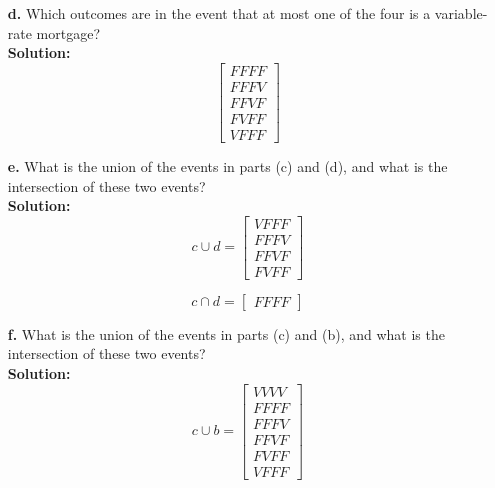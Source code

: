 \documentclass[12pt]{article}
\makeatletter
\theoremstyle{homework}
\newenvironment{exercise}[1]
{\def\@currentlabel{#1}\exercisecore}
{\endexercisecore}
\makeatother
\begin{document}
\begin{exercise}{2.4}
\begin{enumerate}
    
    
    
    
    \item[\textbf{d.}] Which outcomes are in the event that at most one of the four is a variable-rate mortgage?\\
    
    \textbf{Solution:}
    \begin{equation*}
      \begin{bmatrix}
        FFFF \\
        FFFV \\
        FFVF \\ 
        FVFF \\
        VFFF 
      \end{bmatrix}
      \end{equation*}

    \vspace{.5in}
    
    
    
    
    \item[\textbf{e.}] What is the union of the events in parts (c) and (d), and what is the intersection of these two events?\\
     
    \textbf{Solution:}
    \begin{equation*}
      c \cup d =       
      \begin{bmatrix}
        VFFF \\
        FFFV \\
        FFVF \\
        FVFF 
      \end{bmatrix}
      \end{equation*}

      \begin{equation*}
        c \cap d =       
        \begin{bmatrix}
          FFFF 
        \end{bmatrix}
        \end{equation*}
    \vspace{.5in}
    
    
    
    \item[\textbf{f.}] What is the union of the events in parts (c) and (b), and what is the intersection of these two events?\\
     
    
    \textbf{Solution:}
    \begin{equation*}
      c \cup b =       
      \begin{bmatrix}
        VVVV \\
        FFFF \\
        FFFV \\
        FFVF \\ 
        FVFF \\
        VFFF 
      \end{bmatrix}
      \end{equation*}


\end{enumerate}
\end{exercise}
\end{document}
